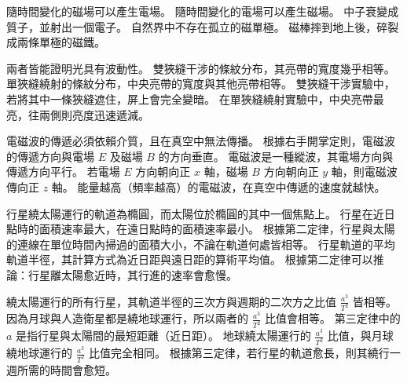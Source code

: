 \documentclass[10pt,a4paper]{article}
\begin{document}


{隨時間變化的磁場可以產生電場。}
{隨時間變化的電場可以產生磁場。}
{中子衰變成質子，並射出一個電子。}
{自然界中不存在孤立的磁單極。}
{磁棒摔到地上後，碎裂成兩條單極的磁鐵。}

{兩者皆能證明光具有波動性。}
{雙狹縫干涉的條紋分布，其亮帶的寬度幾乎相等。}
{單狹縫繞射的條紋分布，中央亮帶的寬度與其他亮帶相等。}
{雙狹縫干涉實驗中，若將其中一條狹縫遮住，屏上會完全變暗。}
{在單狹縫繞射實驗中，中央亮帶最亮，往兩側則亮度迅速遞減。}

{電磁波的傳遞必須依賴介質，且在真空中無法傳播。}
{根據右手開掌定則，電磁波的傳遞方向與電場 $E$ 及磁場 $B$ 的方向垂直。}
{電磁波是一種縱波，其電場方向與傳遞方向平行。}
{若電場 $E$ 方向朝向正 $x$ 軸，磁場 $B$ 方向朝向正 $y$ 軸，則電磁波傳向正 $z$ 軸。}
{能量越高（頻率越高）的電磁波，在真空中傳遞的速度就越快。}

{行星繞太陽運行的軌道為橢圓，而太陽位於橢圓的其中一個焦點上。}
{行星在近日點時的面積速率最大，在遠日點時的面積速率最小。}
{根據第二定律，行星與太陽的連線在單位時間內掃過的面積大小，不論在軌道何處皆相等。}
{行星軌道的平均軌道半徑，其計算方式為近日距與遠日距的算術平均值。}
{根據第二定律可以推論：行星離太陽愈近時，其行進的速率會愈慢。}

{繞太陽運行的所有行星，其軌道半徑的三次方與週期的二次方之比值 $\frac{a^3}{T^2}$ 皆相等。}
{因為月球與人造衛星都是繞地球運行，所以兩者的 $\frac{a^3}{T^2}$ 比值會相等。}
{第三定律中的 $a$ 是指行星與太陽間的最短距離（近日距）。}
{地球繞太陽運行的 $\frac{a^3}{T^2}$ 比值，與月球繞地球運行的 $\frac{a^3}{T^2}$ 比值完全相同。}
{根據第三定律，若行星的軌道愈長，則其繞行一週所需的時間會愈短。}
\end{document}
